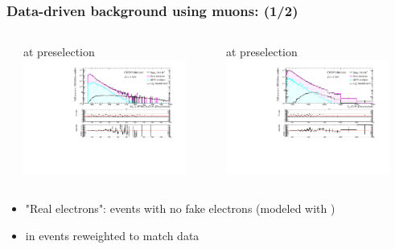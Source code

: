 \documentclass[bigger]{beamer}
\begin{document}
\begin{frame}
\frametitle{Data-driven background using muons: \enujj (1/2)}
\label{sec-1-6-4}
\begin{columns} %
\label{sec-1-6-4-1}
\begin{column}{0.6\textwidth}
\label{sec-1-6-4-1-1}

\centering
\mt at \enujj preselection
\includegraphics[width=0.875\textwidth]{fig/enu/muonbackground/MTenu_PAS_enujj.pdf}
\end{column}
\begin{column}{0.6\textwidth}
\label{sec-1-6-4-1-2}

\centering
\ST at \enujj preselection
\includegraphics[width=0.875\textwidth]{fig/enu/muonbackground/sT_PAS_enujj.pdf}
\end{column}
\end{columns}
\label{sec-1-6-4-2}

\begin{itemize}
\item "Real electrons": \enujj events with no fake electrons (modeled with \munujj)
\item \mt in \munujj events reweighted to match data
\end{itemize}
\end{frame}
\end{document}
